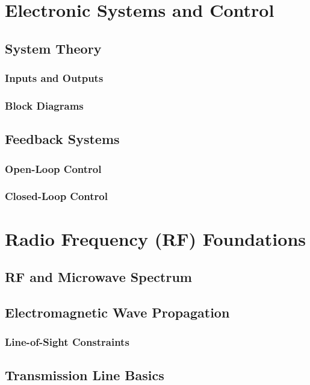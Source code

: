 \documentclass[11pt]{article}
\begin{document}
\section{Electronic Systems and Control} \label{sec:systems_control}
\subsection{System Theory} \label{subsec:system_theory}
\subsubsection{Inputs and Outputs}
\subsubsection{Block Diagrams}
\subsection{Feedback Systems} \label{subsec:feedback}
\subsubsection{Open-Loop Control}
\subsubsection{Closed-Loop Control}

\section{Radio Frequency (RF) Foundations} \label{sec:rf_foundations}
\subsection{RF and Microwave Spectrum} \label{subsec:rf_spectrum}
\subsection{Electromagnetic Wave Propagation} \label{subsec:wave_propagation}
\subsubsection{Line-of-Sight Constraints}
\subsection{Transmission Line Basics} \label{subsec:transmission_lines}
\end{document}
